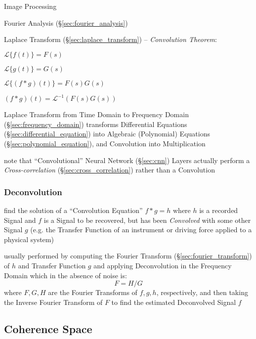 Image Processing

\fist Fourier Analysis (\S\ref{sec:fourier_analysis})

Laplace Transform (\S\ref{sec:laplace_transform}) -- \emph{Convolution Theorem}:

$\mathcal{L}\{f(t)\} = F(s)$

$\mathcal{L}\{g(t)\} = G(s)$

$\mathcal{L}\{(f * g)(t)\} = F(s)G(s)$

$(f*g)(t) = \mathcal{L}^{-1}(F(s)G(s))$

Laplace Transform from Time Domain to Frequency Domain
(\S\ref{sec:frequency_domain}) transforms Differential Equations
(\S\ref{sec:differential_equation}) into Algebraic (Polynomial) Equations
(\S\ref{sec:polynomial_equation}), and Convolution into Multiplication

\fist note that ``Convolutional'' Neural Network (\S\ref{sec:cnn}) Layers
actually perform a \emph{Cross-correlation} (\S\ref{sec:cross_correlation})
rather than a Convolution



\subsubsection{Deconvolution}\label{sec:deconvolution}

find the solution of a ``Convolution Equation'' $f * g = h$ where $h$ is a
recorded Signal and $f$ is a Signal to be recovered, but has been
\emph{Convolved} with some other Signal $g$ (e.g. the Transfer Function of an
instrument or driving force applied to a physical system)

usually performed by computing the Fourier Transform
(\S\ref{sec:fourier_transform}) of $h$ and Transfer Function $g$ and applying
Deconvolution in the Frequency Domain which in the absence of noise is:
\[
  F = H / G
\]
where $F, G, H$ are the Fourier Transforms of $f, g, h$, respectively, and then
taking the Inverse Fourier Transform of $F$ to find the estimated Deconvolved
Signal $f$



\subsection{Coherence Space}\label{sec:coherence_space}

